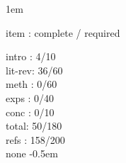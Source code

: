 \documentclass[12pt]{book}
\begin{document}
\raggedbottom
\setlength{\oddsidemargin}{53pt}
\setlength{\evensidemargin}{53pt}
\setlength{\marginparwidth}{57pt}
\setlength{\footskip}{30pt}
\openup 1em

\frontmatter
%

\tableofcontents
\listoffigures
\listoftables
\mainmatter
item : complete / required

intro : 4/10\\
lit-rev: 36/60\\
meth : 0/60\\
exps : 0/40\\
conc : 0/10\\

total: 50/180\\
refs : 158/200\\

\appendix
none
\backmatter
\openup -0.5em
%


\end{document}
